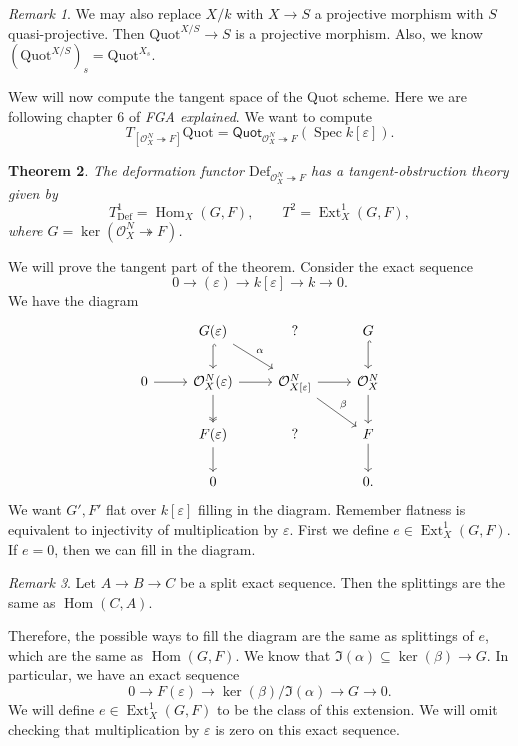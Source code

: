 \documentclass[leqno, openany]{memoir}
\newtheorem{thm}{Theorem}[section]
\theoremstyle{definition}
\theoremstyle{remark}
\newtheorem{rmk}[thm]{Remark}
\theoremstyle{plain}
\theoremstyle{definition}
\theoremstyle{remark}
\newcommand{\ep}{\varepsilon}
\newcommand{\mc}[1]{\mathcal{#1}}
\newcommand{\mr}[1]{\mathrm{#1}}
\newcommand{\ms}[1]{\mathsf{#1}}
\DeclareMathOperator{\Hom}{Hom}
\DeclareMathOperator{\Spec}{Spec}
\DeclareMathOperator{\Ext}{Ext}
\begin{document}
\begin{rmk}
    We may also replace $X/k$ with $X \to S$ a projective morphism with $S$ quasi-projective. Then $\mr{Quot}^{X/S} \to S$ is a projective morphism. Also, we know $(\mr{Quot}^{X/S})_s = \mr{Quot}^{X_s}$.
\end{rmk}

Wew will now compute the tangent space of the Quot scheme. Here we are following chapter 6 of \textit{FGA explained}. We want to compute
\[ T_{[\mc{O}_X^N \twoheadrightarrow F]} \mr{Quot} = \ms{Quot}_{\mc{O}_X^N \twoheadrightarrow F}(\Spec k[\ep]). \]
\begin{thm}
    The deformation functor $\mr{Def}_{\mc{O}_X^N \twoheadrightarrow F}$ has a tangent-obstruction theory given by
    \[ T^1_{\mr{Def}} = \Hom_X(G, F), \qquad T^2 = \Ext_X^1(G, F), \]
    where $G = \ker(\mc{O}_X^N \twoheadrightarrow F)$.
\end{thm}

We will prove the tangent part of the theorem. Consider the exact sequence
\[ 0 \to (\ep) \to k[\ep] \to k \to 0. \]
We have the diagram
\begin{equation*}
\begin{tikzcd}
    & G(\ep) \ar[hookrightarrow]{d} \ar{dr}{\alpha} & ? & G \ar[hookrightarrow]{d} \\
    0 \ar{r} & \mc{O}_X^N(\ep) \ar{r} \ar[twoheadrightarrow]{d} & \mc{O}_{X[\ep]}^N \ar{r} \ar{dr}{\beta} & \mc{O}_X^N \ar{d} \\
    & F(\ep) \ar{d} & ? & F \ar{d} \\
    & 0 & & 0.
\end{tikzcd}
\end{equation*}
We want $G', F'$ flat over $k[\ep]$ filling in the diagram. Remember flatness is equivalent to injectivity of multiplication by $\ep$. First we define $e \in \Ext_X^1(G, F)$. If $e = 0$, then we can fill in the diagram.

\begin{rmk}
    Let $A \to B \to C$ be a split exact sequence. Then the splittings are the same as $\Hom(C, A)$. 
\end{rmk}

Therefore, the possible ways to fill the diagram are the same as splittings of $e$, which are the same as $\Hom(G, F)$. We know that $\Im(\alpha) \subseteq \ker(\beta) \to G$. In particular, we have an exact sequence
\[ 0 \to F(\ep) \to \ker(\beta) / \Im(\alpha) \to G \to 0. \]
We will define $e \in \Ext_X^1(G, F)$ to be the class of this extension. We will omit checking that multiplication by $\ep$ is zero on this exact sequence.
\end{document}
